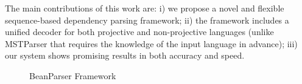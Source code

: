 The main contributions of this work are:
i) we propose a novel and flexible sequence-based dependency parsing framework;
ii) the framework includes a unified decoder for both projective and
non-projective languages (unlike MSTParser that requires the knowledge of
the input language in advance);
iii) our system shows promising results in both accuracy and speed.
\begin{figure*}[th]
\centering
{}
\caption{BeanParser Framework}
\label{fig:workflow}
\end{figure*}
